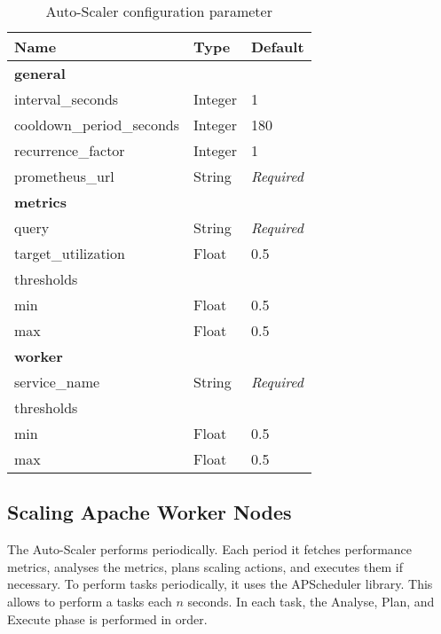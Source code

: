 \begin{table}[]
\centering
\begin{tabular}{@{}lll@{}}
\toprule
Name                      & Type    & Default           \\ \midrule
\multicolumn{3}{l}{\textbf{general}}                    \\ \midrule
interval\_seconds         & Integer & 1                 \\
cooldown\_period\_seconds & Integer & 180               \\
recurrence\_factor        & Integer & 1                 \\
prometheus\_url           & String  & \textit{Required} \\
\multicolumn{3}{l}{\textbf{metrics}}                    \\ \midrule
query                     & String  & \textit{Required} \\
target\_utilization       & Float   & 0.5               \\
\multicolumn{3}{l}{thresholds}                          \\
min                       & Float   & 0.5               \\
max                       & Float   & 0.5               \\
\multicolumn{3}{l}{\textbf{worker}}                     \\ \midrule
service\_name             & String  & \textit{Required} \\
\multicolumn{3}{l}{thresholds}                          \\
min                       & Float   & 0.5               \\
max                       & Float   & 0.5               \\ \bottomrule
\end{tabular}
\caption{Auto-Scaler configuration parameter}
\label{table:06_auto-scaler_config_parameter}
\end{table}


\subsection{Scaling Apache Worker Nodes}
The Auto-Scaler performs periodically. Each period it fetches performance metrics, analyses the metrics, plans scaling actions, and executes them if necessary.
To perform tasks periodically, it uses the APScheduler library. This allows to perform a tasks each $n$ seconds.
In each task, the Analyse, Plan, and Execute phase is performed in order.


